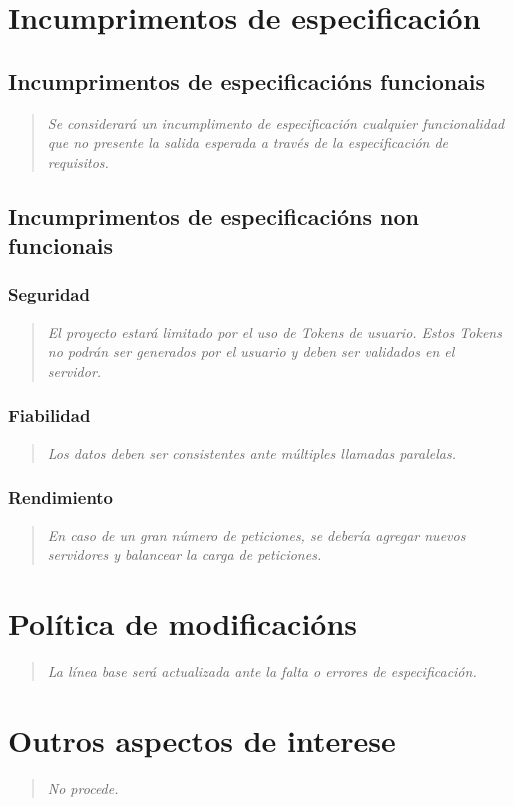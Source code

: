 \documentclass[DIV=calc,paper=a4,fontsize=11pt,onecolumn]{scrartcl}	 %
\newcommand{\hint}[1]{\begin{quote}\itshape #1 \end{quote}}
\begin{document}
\section{Incumprimentos de especificación}

\subsection{Incumprimentos de especificacións funcionais}

\hint{Se considerará un incumplimento de especificación cualquier funcionalidad que no presente la salida esperada a través de la especificación de requisitos.}

\subsection{Incumprimentos de especificacións non funcionais}

\subsubsection{Seguridad}

\hint{El proyecto estará limitado por el uso de Tokens de usuario. Estos Tokens no podrán ser generados por el usuario y deben ser validados en el servidor.}

\subsubsection{Fiabilidad}

\hint{Los datos deben ser consistentes ante múltiples llamadas paralelas.}

\subsubsection{Rendimiento}

\hint{En caso de un gran número de peticiones, se debería agregar nuevos servidores y balancear la carga de peticiones.}

\section{Política de modificacións}

\hint{La línea base será actualizada ante la falta o errores de especificación.}

\section{Outros aspectos de interese}

\hint{No procede.}
\end{document}

